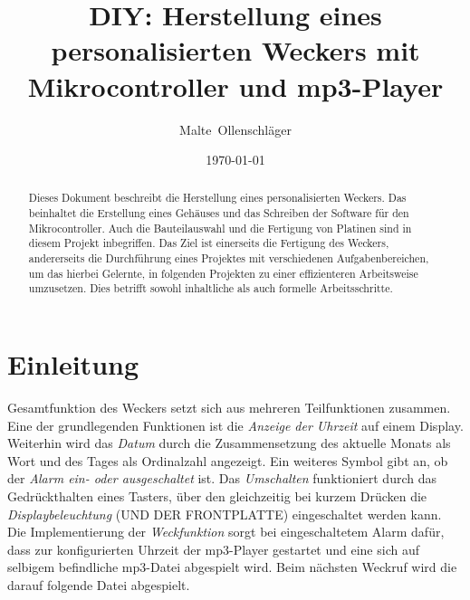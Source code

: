 \documentclass[journal, a4paper]{IEEEtran}
\date{\today}
\author{Malte~Ollenschläger}
\title{DIY: Herstellung eines personalisierten Weckers mit Mikrocontroller und mp3-Player}
\begin{document}
\maketitle
\begin{abstract}
	Dieses Dokument beschreibt die Herstellung eines personalisierten Weckers. Das beinhaltet die Erstellung eines Gehäuses und das Schreiben der Software für den Mikrocontroller. Auch die Bauteilauswahl und die Fertigung von Platinen sind in diesem Projekt inbegriffen. Das Ziel ist einerseits die Fertigung des Weckers, andererseits die Durchführung eines Projektes mit verschiedenen Aufgabenbereichen, um das hierbei Gelernte, in folgenden Projekten zu einer effizienteren Arbeitsweise umzusetzen. Dies betrifft sowohl inhaltliche als auch formelle Arbeitsschritte.
\end{abstract}


\section{Einleitung}
	 Gesamtfunktion des Weckers setzt sich aus mehreren Teilfunktionen zusammen. Eine der grundlegenden Funktionen ist die \textit{Anzeige der Uhrzeit} auf einem Display. Weiterhin wird das \textit{Datum} durch die Zusammensetzung des aktuelle Monats als Wort und des Tages als Ordinalzahl angezeigt. %
	Ein weiteres Symbol gibt an, ob der \textit{Alarm ein- oder ausgeschaltet} ist. Das \textit{Umschalten} funktioniert durch das Gedrückthalten eines Tasters, über den gleichzeitig bei kurzem Drücken die \textit{Displaybeleuchtung} (UND DER FRONTPLATTE) eingeschaltet werden kann. Die Implementierung der \textit{Weckfunktion} sorgt bei eingeschaltetem Alarm dafür, dass zur konfigurierten Uhrzeit der mp3-Player gestartet und eine sich auf selbigem befindliche mp3-Datei abgespielt wird. Beim nächsten Weckruf wird die darauf folgende Datei abgespielt.\par
\end{document}
